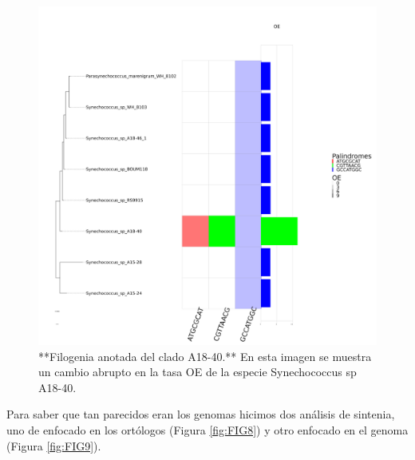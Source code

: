 \documentclass[
]{book}
\begin{document}
\begin{figure}

{\centering \includegraphics[width=1\linewidth]{figures/A18-40_Octanuc_OE_sel32_filogenia_HIG} 

}

\caption{**Filogenia anotada del clado A18-40.** En esta imagen se muestra un cambio abrupto en la tasa OE de la especie Synechococcus sp A18-40.}\label{fig:FIG7}
\end{figure}

Para saber que tan parecidos eran los genomas hicimos dos análisis de sintenia, uno de enfocado en los ortólogos (Figura \ref{fig:FIG8}) y otro enfocado en el genoma (Figura \ref{fig:FIG9}).
\end{document}
